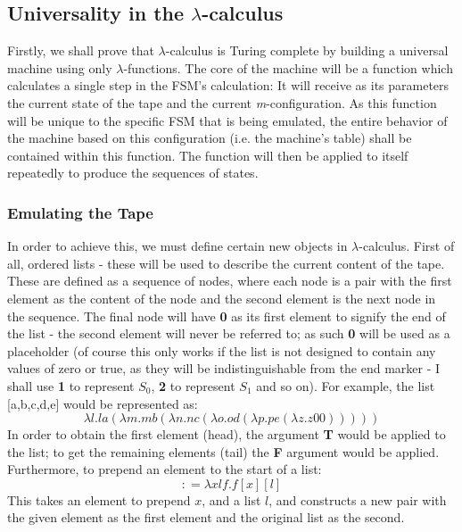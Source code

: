 \documentclass[Master.tex]{subfiles}
\begin{document}
\subsection{Universality in the $\lambda$-calculus}
Firstly, we shall prove that $\lambda$-calculus is Turing complete by building a universal machine using only $\lambda$-functions. The core of the machine will be a function which calculates a single step in the FSM's calculation: It will receive as its parameters the current state of the tape and the current \textit{m}-configuration. As this function will be unique to the specific FSM that is being emulated, the entire behavior of the machine based on this configuration (i.e. the machine's table) shall be contained within this function. The function will then be applied to itself repeatedly to produce the sequences of states.

\subsubsection{Emulating the Tape}
In order to achieve this, we must define certain new objects in $\lambda$-calculus. First of all, ordered lists - these will be used to describe the current content of the tape. These are defined as a sequence of nodes, where each node is a pair with the first element as the content of the node and the second element is the next node in the sequence. The final node will have \textbf{0} as its first element to signify the end of the list - the second element will never be referred to; as such \textbf{0} will be used as a placeholder (of course this only works if the list is not designed to contain any values of zero or true, as they will be indistinguishable from the end marker - I shall use \textbf{1} to represent $S_0$, \textbf{2} to represent $S_1$ and so on). For example, the list [a,b,c,d,e] would be represented as:
\begin{equation*}
\lambda l.la(\lambda m.mb(\lambda n.nc(\lambda o.od(\lambda p.pe(\lambda z.z\bm{\mathrm{00}})))))
\end{equation*}
In order to obtain the first element (head), the argument \textbf{T} would be applied to the list; to get the remaining elements (tail) the \textbf{F} argument would be applied. 
Furthermore, to prepend an element to the start of a list:
\begin{equation*}
\bm{\mathrm{:}} = \lambda xlf.f[x][l]
\end{equation*}
This takes an element to prepend $x$, and a list $l$, and constructs a new pair with the given element as the first element and the original list as the second.
 
\end{document}
